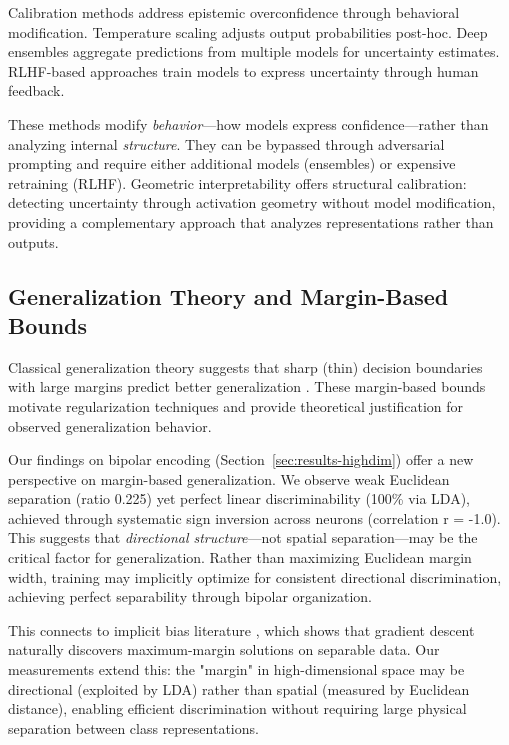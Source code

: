 \documentclass[11pt]{article}
\begin{document}
Calibration methods address epistemic overconfidence through behavioral modification. Temperature scaling \citep{guo2017calibration} adjusts output probabilities post-hoc. Deep ensembles \citep{lakshminarayanan2017simple} aggregate predictions from multiple models for uncertainty estimates. RLHF-based approaches \citep{ouyang2022training} train models to express uncertainty through human feedback.

These methods modify \textit{behavior}---how models express confidence---rather than analyzing internal \textit{structure}. They can be bypassed through adversarial prompting and require either additional models (ensembles) or expensive retraining (RLHF). Geometric interpretability offers structural calibration: detecting uncertainty through activation geometry without model modification, providing a complementary approach that analyzes representations rather than outputs.

\subsection{Generalization Theory and Margin-Based Bounds}

Classical generalization theory suggests that sharp (thin) decision boundaries with large margins
predict better generalization \citep{bartlett2017spectrally, neyshabur2018pac}. These margin-based
bounds motivate regularization techniques and provide theoretical justification for observed generalization behavior.

Our findings on bipolar encoding (Section~\ref{sec:results-highdim}) offer a new perspective on margin-based generalization. We observe weak Euclidean separation (ratio 0.225) yet perfect linear discriminability (100\% via LDA), achieved through systematic sign inversion across neurons (correlation r = -1.0). This suggests that \textit{directional structure}---not spatial separation---may be the critical factor for generalization. Rather than maximizing Euclidean margin width, training may implicitly optimize for consistent directional discrimination, achieving perfect separability through bipolar organization.

This connects to implicit bias literature \citep{soudry2018implicit}, which shows that gradient descent naturally discovers maximum-margin solutions on separable data. Our measurements extend this: the "margin" in high-dimensional space may be directional (exploited by LDA) rather than spatial (measured by Euclidean distance), enabling efficient discrimination without requiring large physical separation between class representations.
\end{document}
